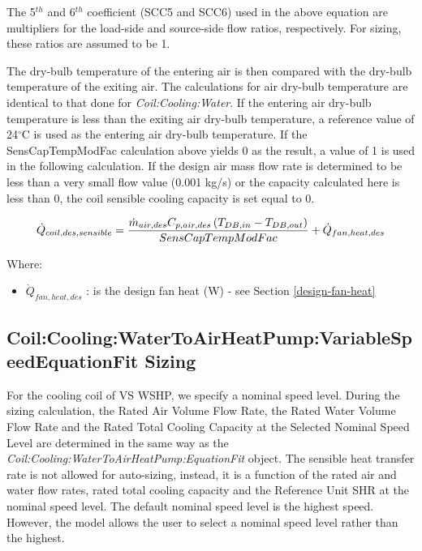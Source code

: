 The 5\(^{th}\) and 6\(^{th}\) coefficient (SCC5 and SCC6) used in the above equation are multipliers for the load-side and source-side flow ratios, respectively. For sizing, these ratios are assumed to be 1.

The dry-bulb temperature of the entering air is then compared with the dry-bulb temperature of the exiting air. The calculations for air dry-bulb temperature are identical to that done for \emph{Coil:Cooling:Water}. If the entering air dry-bulb temperature is less than the exiting air dry-bulb temperature, a reference value of 24\(^{\circ}\)C is used as the entering air dry-bulb temperature. If the SensCapTempModFac calculation above yields 0 as the result, a value of 1 is used in the following calculation. If the design air mass flow rate is determined to be less than a very small flow value (0.001 kg/s) or the capacity calculated here is less than 0, the coil sensible cooling capacity is set equal to 0.

\begin{equation}
  \dot{Q}_{coil,des,sensible} = \frac{\dot{m}_{air,des}C_{p,air,des}\left(T_{DB,in}-T_{DB,out}\right)}{SensCapTempModFac} +\dot{Q}_{fan,heat,des}
\end{equation}

Where:

\begin{itemize}
\item
  \(\dot{Q}_{fan,heat,des}\) : is the design fan heat (W) - see Section \ref{design-fan-heat}
\end{itemize}

\subsection{Coil:Cooling:WaterToAirHeatPump:VariableSpeedEquationFit Sizing}\label{coilcoolingwatertoairheatpumpvariablespeedequationfit-sizing}

For the cooling coil of VS WSHP, we specify a nominal speed level. During the sizing calculation, the Rated Air Volume Flow Rate, the Rated Water Volume Flow Rate and the Rated Total Cooling Capacity at the Selected Nominal Speed Level are determined in the same way as the \emph{Coil:Cooling:WaterToAirHeatPump:EquationFit} object. The sensible heat transfer rate is not allowed for auto-sizing, instead, it is a function of the rated air and water flow rates, rated total cooling capacity and the Reference Unit SHR at the nominal speed level. The default nominal speed level is the highest speed. However, the model allows the user to select a nominal speed level rather than the highest.

